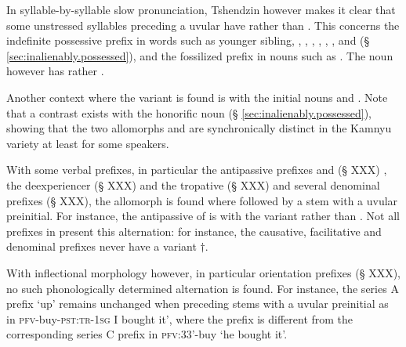 In syllable-by-syllable slow pronunciation, Tshendzin however makes it clear that some unstressed syllables preceding a uvular have  rather than . This concerns the indefinite possessive prefix in words such as  {younger sibling}, , , , , , ,  and  (§ \ref{sec:inalienably.possessed}), and the fossilized prefix in nouns such as . The noun  however has  rather .

Another context where the variant  is found is with the  initial nouns  and . Note that a contrast exists with the honorific noun  (§ \ref{sec:inalienably.possessed}), showing that the two allomorphs  and  are synchronically distinct in the Kamnyu variety at least for some speakers.

With some verbal prefixes, in particular the antipassive prefixes  and  (§ XXX) , the deexperiencer  (§ XXX)  and the tropative  (§ XXX) and several denominal prefixes (§ XXX), the  allomorph is found where followed by a stem with a uvular preinitial. For instance, the antipassive of  is  with the variant  rather than . Not all prefixes in  present this alternation: for instance, the causative, facilitative and denominal prefixes  never have a variant $\dagger$.

With inflectional morphology however, in particular orientation prefixes (§ XXX), no such phonologically determined alternation is found. For instance, the series A prefix  `up' remains unchanged when preceding stems with a uvular preinitial as in  \textsc{pfv}-buy-\textsc{pst}:\textsc{tr}-\textsc{1sg}  I bought it', where the prefix  is different from the corresponding series C prefix  in  \textsc{pfv}:3\fl{}3'-buy `he bought it'.

